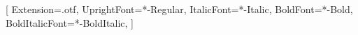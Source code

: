 \usepackage[left=3cm, right=1.5cm, top=2cm, bottom=2cm, bindingoffset=0cm]{geometry}

\setmainfont{Tempora}[
    Extension=.otf,
    UprightFont=*-Regular,
    ItalicFont=*-Italic,
    BoldFont=*-Bold,
    BoldItalicFont=*-BoldItalic,
]

\renewcommand{\cftchapfont}{\normalfont}
\renewcommand{\cftchappagefont}{\normalfont}
\renewcommand{\cftchapdotsep}{\cftdotsep}
\renewcommand{\cftchapleader}{\cftdotfill{\cftchapdotsep}}

\captionsetup{justification=centering} %
\captionsetup[figure]{name=Рисунок}    %
\setlength\fboxsep{3pt}                %
\setlength\fboxrule{1pt}               %
\renewcommand\thesubfigure{\asbuk{subfigure}} %

\usepackage[shortlabels]{enumitem}

\makeatletter
{}
\makeatother



\linespread{1.5}              %
\setlength\parindent{1.25cm}  %
\usepackage{indentfirst}      %

\usepackage{fancyhdr}

\let\oldproofname=\proofname \renewcommand{\proofname}{\rm\bf{\oldproofname}}


